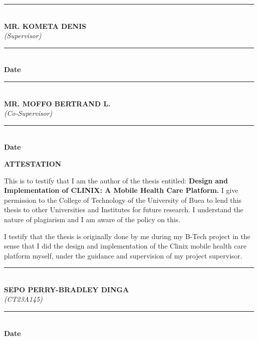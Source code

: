 \vspace{3.5cm}
\noindent
\begin{minipage}[t]{0.48\textwidth}
\rule{6cm}{0.4pt}\\[0.3cm]
\textbf{MR. KOMETA DENIS}\\[0.1cm]
\textit{(Supervisor)}
\end{minipage}
\hfill
\begin{minipage}[t]{0.48\textwidth}
\hfill\rule{4cm}{0.4pt}\\[0.3cm]
\hfill\textbf{Date}
\end{minipage}

\vspace{2.0cm}
\noindent
\begin{minipage}[t]{0.48\textwidth}
\rule{6cm}{0.4pt}\\[0.3cm]
\textbf{MR. MOFFO BERTRAND L.}\\[0.1cm]
\textit{(Co-Supervisor)}
\end{minipage}
\hfill
\begin{minipage}[t]{0.48\textwidth}
\hfill\rule{4cm}{0.4pt}\\[0.3cm]
\hfill\textbf{Date}
\end{minipage}

\clearpage

\begin{center}
{\Large\bfseries ATTESTATION}
\end{center}
\vspace{1.0cm}

This is to testify that I am the author of the thesis entitled: \textbf{Design and Implementation of CLINIX: A Mobile Health Care Platform.} I give permission to the College of Technology of the University of Buea to lend this thesis to other Universities and Institutes for future research. I understand the nature of plagiarism and I am aware of the policy on this.

\vspace{0.6cm}
I testify that the thesis is originally done by me during my B-Tech project in the sense that I did the design and implementation of the Clinix mobile health care platform myself, under the guidance and supervision of my project supervisor.

\vspace{3.0cm}
\noindent
\begin{minipage}[t]{0.48\textwidth}
\rule{6cm}{0.4pt}\\[0.3cm]
\textbf{SEPO PERRY-BRADLEY DINGA}\\[0.1cm]
\textit{(CT23A145)}
\end{minipage}
\hfill
\begin{minipage}[t]{0.48\textwidth}
\hfill\rule{4cm}{0.4pt}\\[0.3cm]
\hfill\textbf{Date}
\end{minipage}

